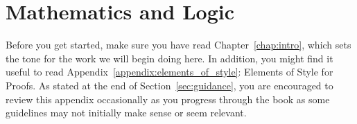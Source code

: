 \chapter{Mathematics and Logic}\label{chap:IntroToMath}


Before you get started, make sure you have read Chapter~\ref{chap:intro}, which sets the tone for the work we will begin doing here. In addition, you might find it useful to read Appendix~\ref{appendix:elements_of_style}: Elements of Style for Proofs. As stated at the end of Section~\ref{sec:guidance}, you are encouraged to review this appendix occasionally as you progress through the book as some guidelines may not initially make sense or seem relevant.